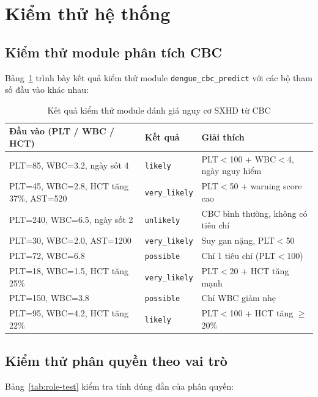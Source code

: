 \documentclass[oneside, a4paper]{book}
\theoremstyle{plain}
\theoremstyle{plain}
\theoremstyle{definition}
\theoremstyle{remark}
\begin{document}
\section{Kiểm thử hệ thống}

\subsection{Kiểm thử module phân tích CBC}

Bảng~\ref{tab:cbc-test} trình bày kết quả kiểm thử module \texttt{dengue\_cbc\_predict} với các bộ tham số đầu vào khác nhau:

\begin{table}[H]
\centering
\begin{tabular}{|p{4.5cm}|p{2.5cm}|p{5.2cm}|}
\hline
\textbf{Đầu vào (PLT / WBC / HCT)} & \textbf{Kết quả} & \textbf{Giải thích} \\
\hline
PLT=85, WBC=3.2, ngày sốt 4 & \texttt{likely} & PLT$<$100 + WBC$<$4, ngày nguy hiểm \\
PLT=45, WBC=2.8, HCT tăng 37\%, AST=520 & \texttt{very\_likely} & PLT$<$50 + warning score cao \\
PLT=240, WBC=6.5, ngày sốt 2 & \texttt{unlikely} & CBC bình thường, không có tiêu chí \\
PLT=30, WBC=2.0, AST=1200 & \texttt{very\_likely} & Suy gan nặng, PLT$<$50 \\
PLT=72, WBC=6.8 & \texttt{possible} & Chỉ 1 tiêu chí (PLT$<$100) \\
PLT=18, WBC=1.5, HCT tăng 25\% & \texttt{very\_likely} & PLT$<$20 + HCT tăng mạnh \\
PLT=150, WBC=3.8 & \texttt{possible} & Chỉ WBC giảm nhẹ \\
PLT=95, WBC=4.2, HCT tăng 22\% & \texttt{likely} & PLT$<$100 + HCT tăng $\geq$20\% \\
\hline
\end{tabular}
\caption{Kết quả kiểm thử module đánh giá nguy cơ SXHD từ CBC}
\label{tab:cbc-test}
\end{table}

\subsection{Kiểm thử phân quyền theo vai trò}

Bảng~\ref{tab:role-test} kiểm tra tính đúng đắn của phân quyền:
\end{document}
